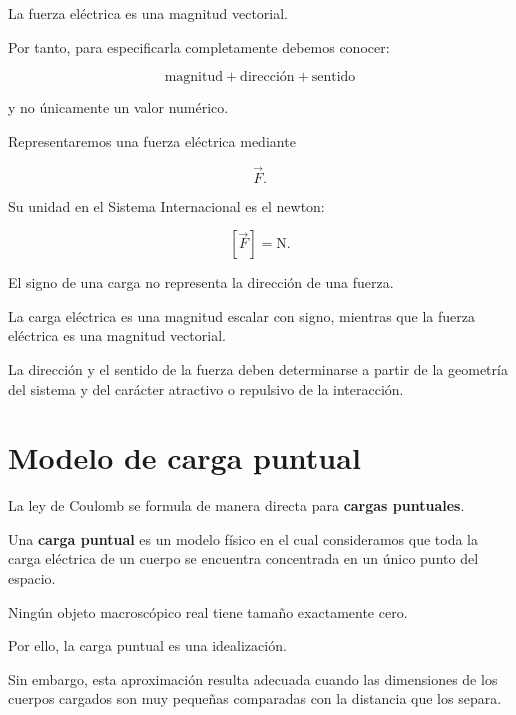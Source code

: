 La fuerza eléctrica es una magnitud vectorial.

Por tanto, para especificarla completamente debemos conocer:

\[
\boxed{
\text{magnitud}
+
\text{dirección}
+
\text{sentido}
}
\]

y no únicamente un valor numérico.

Representaremos una fuerza eléctrica mediante

\[
\vec{F}.
\]

Su unidad en el Sistema Internacional es el newton:

\[
[\vec{F}]=\si{\newton}.
\]

\begin{idea}

El signo de una carga no representa la dirección de una fuerza.

La carga eléctrica es una magnitud escalar con signo, mientras que la fuerza
eléctrica es una magnitud vectorial.

La dirección y el sentido de la fuerza deben determinarse a partir de la
geometría del sistema y del carácter atractivo o repulsivo de la
interacción.

\end{idea}



\section{Modelo de carga puntual}

La ley de Coulomb se formula de manera directa para
\textbf{cargas puntuales}.

\begin{definicion}

Una \textbf{carga puntual} es un modelo físico en el cual consideramos que
toda la carga eléctrica de un cuerpo se encuentra concentrada en un único
punto del espacio.

\end{definicion}

Ningún objeto macroscópico real tiene tamaño exactamente cero.

Por ello, la carga puntual es una idealización.

Sin embargo, esta aproximación resulta adecuada cuando las dimensiones de
los cuerpos cargados son muy pequeñas comparadas con la distancia que los
separa.

